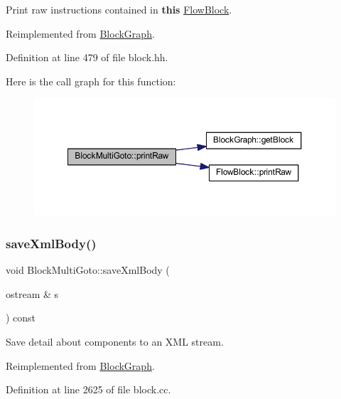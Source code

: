 Print raw instructions contained in {\bfseries{this}} \mbox{\hyperlink{class_flow_block}{Flow\+Block}}. 



Reimplemented from \mbox{\hyperlink{class_block_graph_abcae771fc675bcc52c78b2f1dc0ab98a}{Block\+Graph}}.



Definition at line 479 of file block.\+hh.

Here is the call graph for this function\+:
\nopagebreak
\begin{figure}[H]
\begin{center}
\leavevmode
\includegraphics[width=350pt]{class_block_multi_goto_a56b9c331488b4bf0c0f01cc583192630_cgraph}
\end{center}
\end{figure}
\mbox{\label{class_block_multi_goto_ac537bd161b597061aeca88bcc01e260c}} 
\subsubsection{\texorpdfstring{saveXmlBody()}{saveXmlBody()}}
{\footnotesize\ttfamily void Block\+Multi\+Goto\+::save\+Xml\+Body (\begin{DoxyParamCaption}\item[{ostream \&}]{s }\end{DoxyParamCaption}) const\hspace{0.3cm}{\ttfamily [virtual]}}



Save detail about components to an X\+ML stream. 



Reimplemented from \mbox{\hyperlink{class_block_graph_a881076195239ce5c2e5c865f22714d03}{Block\+Graph}}.



Definition at line 2625 of file block.\+cc.

